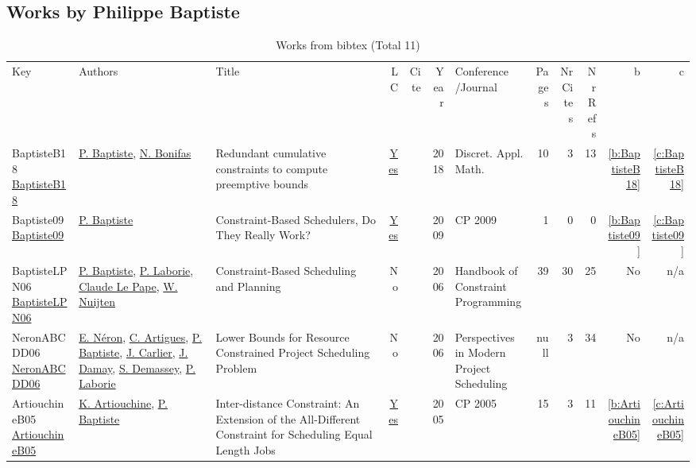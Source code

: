 \subsection{Works by Philippe Baptiste}
\label{sec:a164}
{\scriptsize
\begin{longtable}{>{\raggedright\arraybackslash}p{3cm}>{\raggedright\arraybackslash}p{6cm}>{\raggedright\arraybackslash}p{6.5cm}rrrp{2.5cm}rrrrr}
\rowcolor{white}\caption{Works from bibtex (Total 11)}\\ \toprule
\rowcolor{white}Key & Authors & Title & LC & Cite & Year & \shortstack{Conference\\/Journal} & Pages & \shortstack{Nr\\Cites} & \shortstack{Nr\\Refs} & b & c \\ \midrule\endhead
\bottomrule
\endfoot
BaptisteB18 \href{https://doi.org/10.1016/j.dam.2017.05.001}{BaptisteB18} & \hyperref[auth:a164]{P. Baptiste}, \hyperref[auth:a714]{N. Bonifas} & Redundant cumulative constraints to compute preemptive bounds & \href{works/BaptisteB18.pdf}{Yes} & \cite{BaptisteB18} & 2018 & Discret. Appl. Math. & 10 & 3 & 13 & \ref{b:BaptisteB18} & \ref{c:BaptisteB18}\\
Baptiste09 \href{https://doi.org/10.1007/978-3-642-04244-7\_1}{Baptiste09} & \hyperref[auth:a164]{P. Baptiste} & Constraint-Based Schedulers, Do They Really Work? & \href{works/Baptiste09.pdf}{Yes} & \cite{Baptiste09} & 2009 & CP 2009 & 1 & 0 & 0 & \ref{b:Baptiste09} & \ref{c:Baptiste09}\\
BaptisteLPN06 \href{https://doi.org/10.1016/S1574-6526(06)80026-X}{BaptisteLPN06} & \hyperref[auth:a164]{P. Baptiste}, \hyperref[auth:a118]{P. Laborie}, \hyperref[auth:a165]{Claude Le Pape}, \hyperref[auth:a666]{W. Nuijten} & Constraint-Based Scheduling and Planning & No & \cite{BaptisteLPN06} & 2006 & Handbook of Constraint Programming & 39 & 30 & 25 & No & n/a\\
NeronABCDD06 \href{http://dx.doi.org/10.1007/978-0-387-33768-5_7}{NeronABCDD06} & \hyperref[auth:a917]{E. Néron}, \hyperref[auth:a6]{C. Artigues}, \hyperref[auth:a164]{P. Baptiste}, \hyperref[auth:a858]{J. Carlier}, \hyperref[auth:a918]{J. Damay}, \hyperref[auth:a246]{S. Demassey}, \hyperref[auth:a118]{P. Laborie} & Lower Bounds for Resource Constrained Project Scheduling Problem & No & \cite{NeronABCDD06} & 2006 & Perspectives in Modern Project Scheduling & null & 3 & 34 & No & n/a\\
ArtiouchineB05 \href{https://doi.org/10.1007/11564751\_8}{ArtiouchineB05} & \hyperref[auth:a265]{K. Artiouchine}, \hyperref[auth:a164]{P. Baptiste} & Inter-distance Constraint: An Extension of the All-Different Constraint for Scheduling Equal Length Jobs & \href{works/ArtiouchineB05.pdf}{Yes} & \cite{ArtiouchineB05} & 2005 & CP 2005 & 15 & 3 & 11 & \ref{b:ArtiouchineB05} & \ref{c:ArtiouchineB05}\\

\end{longtable}}
